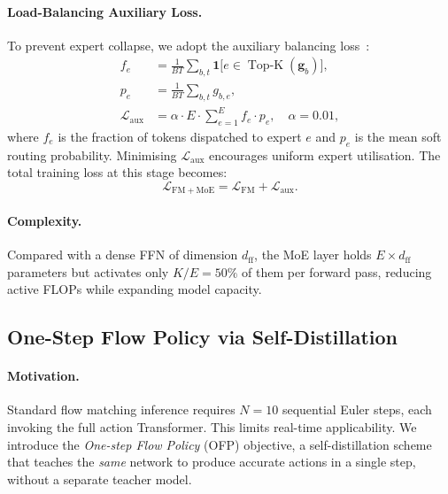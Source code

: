 \documentclass[10pt,twocolumn]{article}
\begin{document}
\paragraph{Load-Balancing Auxiliary Loss.}
To prevent expert collapse, we adopt the auxiliary balancing
loss~\cite{fedus2022switch}:
\begin{align}
  f_e &= \frac{1}{BT}\sum_{b,t} \mathbf{1}\bigl[e \in \operatorname{Top\text{-}K}(\mathbf{g}_b)\bigr],
  \label{eq:moe_fe}\\
  p_e &= \frac{1}{BT}\sum_{b,t} g_{b,e},
  \label{eq:moe_pe}\\
  \mathcal{L}_{\mathrm{aux}} &= \alpha \cdot E \cdot \sum_{e=1}^{E} f_e \cdot p_e,
  \quad \alpha = 0.01,
  \label{eq:moe_aux}
\end{align}
where $f_e$ is the fraction of tokens dispatched to expert $e$ and $p_e$
is the mean soft routing probability.
Minimising $\mathcal{L}_{\mathrm{aux}}$ encourages uniform expert utilisation.
The total training loss at this stage becomes:
\begin{equation}
  \mathcal{L}_{\mathrm{FM+MoE}} = \mathcal{L}_{\mathrm{FM}} +
  \mathcal{L}_{\mathrm{aux}}.
  \label{eq:loss_moe}
\end{equation}

\paragraph{Complexity.}
Compared with a dense FFN of dimension $d_{\mathrm{ff}}$, the MoE layer holds
$E \times d_{\mathrm{ff}}$ parameters but activates only $K/E = 50\%$ of them
per forward pass, reducing active FLOPs while expanding model capacity.


\subsection{One-Step Flow Policy via Self-Distillation}
\label{sec:method:ofp}

\paragraph{Motivation.}
Standard flow matching inference requires $N{=}10$ sequential Euler steps,
each invoking the full action Transformer. This limits real-time applicability.
We introduce the \emph{One-step Flow Policy} (OFP) objective, a
self-distillation scheme that teaches the \emph{same} network to produce
accurate actions in a single step, without a separate teacher model.
\end{document}
